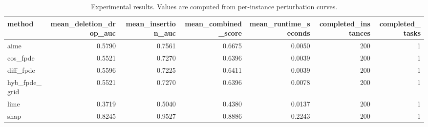 \begin{table}[t]
\caption{Experimental results. Values are computed from per-instance perturbation curves.}
\label{tab:main_results_computed}
\centering
\begin{tabular}{lrrrrrr}
\toprule
method & mean\_deletion\_drop\_auc & mean\_insertion\_auc & mean\_combined\_score & mean\_runtime\_seconds & completed\_instances & completed\_tasks \\
\midrule
aime & 0.5790 & 0.7561 & 0.6675 & 0.0050 & 200 & 1 \\
cos\_fpde & 0.5521 & 0.7270 & 0.6396 & 0.0039 & 200 & 1 \\
diff\_fpde & 0.5596 & 0.7225 & 0.6411 & 0.0039 & 200 & 1 \\
hyb\_fpde\_grid & 0.5521 & 0.7270 & 0.6396 & 0.0078 & 200 & 1 \\
lime & 0.3719 & 0.5040 & 0.4380 & 0.0137 & 200 & 1 \\
shap & 0.8245 & 0.9527 & 0.8886 & 0.2243 & 200 & 1 \\
\bottomrule
\end{tabular}

\end{table}
